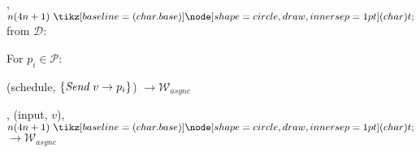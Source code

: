 \begin{bbox}[title={$\F_{\msf{async-bcast}} (\mathcal{D}, \mathcal{P}=p_1,...,p_n)$}]

\OnInput {}, $n(4n+1) \token$ from $\mathcal{D}$:
	\begin{renumerate}
	\item For $p_i \in \mathcal{P}$:
		\begin{ritemize}	
		\item \Send (schedule, $\{\emph{Send}~ v \rightarrow p_i\}$) $\rightarrow \mathcal{W}_{async}$
		\end{ritemize}

	\item \Leak, (input, $v$), $n(4n+1) \token$ $\rightarrow \mathcal{W}_{async}$
	\end{renumerate}

\end{bbox}


